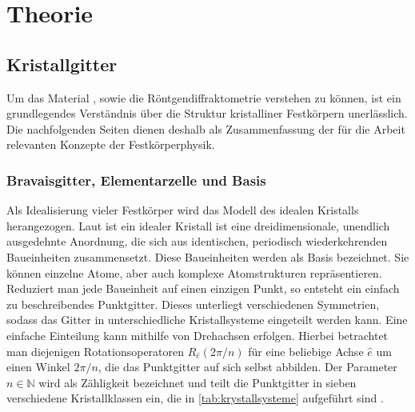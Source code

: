 \section{Theorie}\label{sec:theorie}

\subsection{Kristallgitter}\label{subsec:kristallgitter}
Um das Material \heo, sowie die Röntgendiffraktometrie verstehen zu können, ist ein grundlegendes Verständnis
über die Struktur kristalliner Festkörpern unerlässlich.
Die nachfolgenden Seiten dienen deshalb als Zusammenfassung der für die Arbeit relevanten Konzepte der Festkörperphysik.

\subsubsection{Bravaisgitter, Elementarzelle und Basis}
Als Idealisierung vieler Festkörper wird das Modell des idealen Kristalls herangezogen.
Laut  ist ein idealer Kristall ist eine dreidimensionale, unendlich ausgedehnte Anordnung,
die sich aus identischen, periodisch wiederkehrenden Baueinheiten zusammensetzt.
Diese Baueinheiten werden als Basis bezeichnet.
Sie können einzelne Atome, aber auch komplexe Atomstrukturen repräsentieren.
Reduziert man jede Baueinheit auf einen einzigen Punkt, so entsteht ein einfach zu beschreibendes Punktgitter.
Dieses unterliegt verschiedenen Symmetrien, sodass das Gitter in unterschiedliche Kristallsysteme eingeteilt werden
kann.
Eine einfache Einteilung kann mithilfe von Drehachsen erfolgen.
Hierbei betrachtet man diejenigen Rotationsoperatoren $R_{\hat{e}}(2\pi / n)$ für eine beliebige Achse $\hat{e}$ um
einen Winkel $2 \pi /n$, die das Punktgitter auf sich selbst abbilden.
Der Parameter $n \in \mathbb{N}$ wird als Zähligkeit bezeichnet und teilt die Punktgitter in sieben verschiedene
Kristallklassen ein, die in \cref{tab:krystallsysteme} aufgeführt sind \autocite{Hunklinger}.

